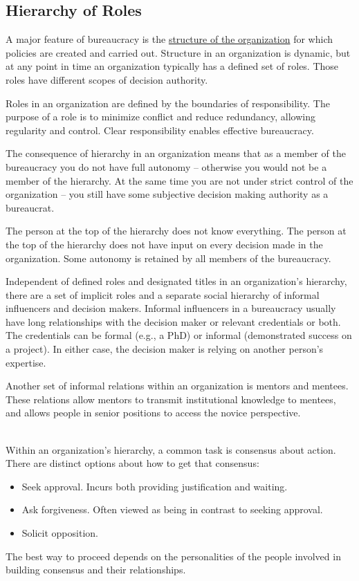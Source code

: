 \subsection{Hierarchy of Roles}
A major feature of bureaucracy is the \href{https://en.wikipedia.org/wiki/Organizational_structure}{structure of the organization} for which policies are created and carried out. Structure in an organization is dynamic, but at any point in time an organization typically has a defined set of roles. Those roles have different scopes of decision authority. 

Roles in an organization are defined by the boundaries of responsibility. The purpose of a role is to minimize conflict and reduce redundancy, allowing regularity and control. Clear responsibility enables effective bureaucracy. 

The consequence of hierarchy in an organization means that as a member of the bureaucracy you do not have full autonomy -- otherwise you would not be a member of the hierarchy. At the same time you are not under strict control of the organization -- you still have some subjective decision making authority as a bureaucrat.

The person at the top of the hierarchy does not know everything. The person at the top of the hierarchy does not have input on every decision made in the organization. Some autonomy is retained by all members of the bureaucracy.

Independent of defined roles and designated titles in an organization's hierarchy, there are a set of implicit roles and a separate social hierarchy of informal influencers and decision makers. Informal influencers in a bureaucracy usually have long relationships with the decision maker or relevant credentials or both. The credentials can be formal (e.g., a PhD) or informal (demonstrated success on a project). In either case, the decision maker is relying on another person's expertise. 

Another set of informal relations within an organization is mentors and mentees. These relations allow mentors to transmit institutional knowledge to mentees, and allows people in senior positions to access the novice perspective. 

\ \\
Within an organization's hierarchy, a common task is consensus about action. There are distinct options about how to get that consensus:
\begin{itemize}
    \item Seek approval. Incurs both providing justification and waiting.
    \item Ask forgiveness. Often viewed as being in contrast to seeking approval. 
    \item Solicit opposition. 
\end{itemize}
The best way to proceed depends on the personalities of the people involved in building consensus and their relationships. 

